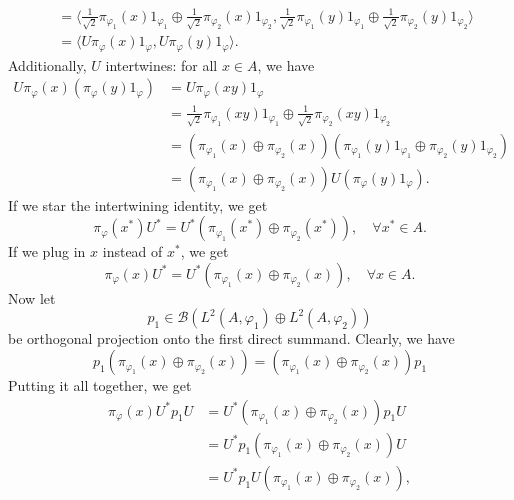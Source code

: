 \begin{myproof}
\begin{itemize}
\begin{align*}
      &= \langle \frac{1}{\sqrt{2}} \pi_{\varphi_1} (x) 1_{\varphi_1} \oplus \frac{1}{\sqrt{2}} \pi_{\varphi_2} (x) 1_{\varphi_2}, \frac{1}{\sqrt{2}} \pi_{\varphi_1} (y) 1_{\varphi_1} \oplus \frac{1}{\sqrt{2}} \pi_{\varphi_2} (y) 1_{\varphi_2} \rangle\\
      &= \langle U \pi_\varphi (x) 1_\varphi, U \pi_\varphi (y) 1_\varphi \rangle.
    \end{align*}
    Additionally, $U$ intertwines: for all $x \in A$, we have
    \begin{align*}
      U \pi_{\varphi}(x) (\pi_{\varphi} (y) 1_{\varphi}) &= U \pi_{\varphi} (xy) 1_{\varphi}\\
      &= \frac{1}{\sqrt{2}} \pi_{\varphi_1} (xy) 1_{\varphi_1} \oplus \frac{1}{\sqrt{2}} \pi_{\varphi_2} (xy) 1_{\varphi_2}\\
      &= \left(\pi_{\varphi_1} (x) \oplus \pi_{\varphi_2} (x)\right) (\pi_{\varphi_1} (y) 1_{\varphi_1} \oplus \pi_{\varphi_2} (y) 1_{\varphi_2})\\
      &= \left(\pi_{\varphi_1} (x) \oplus \pi_{\varphi_2} (x)\right) U (\pi_{\varphi} (y) 1_{\varphi}).
    \end{align*}
    If we star the intertwining identity, we get 
    \begin{equation*}
      \pi_{\varphi}(x^*) U^* = U^* \left(\pi_{\varphi_1} (x^*) \oplus \pi_{\varphi_2} (x^*)\right),\quad \forall x^* \in A.
    \end{equation*}
    If we plug in $x$ instead of $x^*$, we get 
    \begin{equation*}
      \pi_{\varphi}(x) U^* = U^* \left(\pi_{\varphi_1} (x) \oplus \pi_{\varphi_2} (x)\right),\quad \forall x \in A.
    \end{equation*}
    Now let $$p_1 \in \mathcal{B} (L^2 (A, \varphi_1) \oplus L^2 (A, \varphi_2))$$
    be orthogonal projection onto the first direct summand.
    Clearly, we have
    \begin{equation*}
      p_1 \left(\pi_{\varphi_1} (x) \oplus \pi_{\varphi_2} (x)\right) = \left(\pi_{\varphi_1} (x) \oplus \pi_{\varphi_2} (x)\right) p_1 
    \end{equation*}
    Putting it all together, we get 
    \begin{align*}
      \pi_{\varphi} (x) U^* p_1 U &= U^* (\pi_{\varphi_1} (x) \oplus \pi_{\varphi_2} (x)) p_1 U\\
      &= U^* p_1 (\pi_{\varphi_1} (x) \oplus \pi_{\varphi_2} (x)) U\\
      &= U^* p_1 U (\pi_{\varphi_1} (x) \oplus \pi_{\varphi_2} (x)),

\end{align*}
\end{itemize}
\end{myproof}
